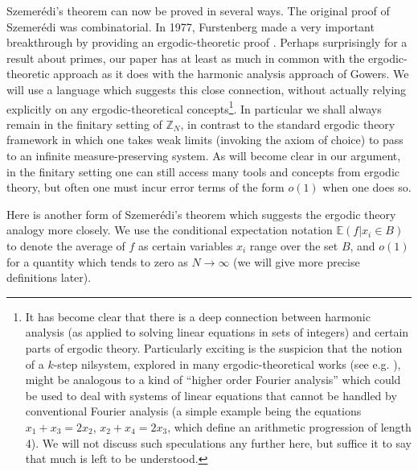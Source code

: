\documentclass[12pt,a4paper,reqno]{amsart}
\numberwithin{equation}{section}
\theoremstyle{plain}
\theoremstyle{definition}
\def\Z{{\mathbb Z}}
\def\vs{\vspace{11pt}}
\def\ni{\noindent}
\begin{document}
\ni Szemer\'edi's theorem can now be proved in several ways. The original proof of Szemer\'edi \cite{szemeredi-4,szemeredi} was combinatorial. In 1977, Furstenberg made a very important breakthrough by providing an ergodic-theoretic proof \cite{furst}. Perhaps surprisingly for a result about primes, our paper has at least as much in common with the ergodic-theoretic approach as it does with the harmonic analysis approach of Gowers. We will use a language which suggests this close connection, without actually relying explicitly on any ergodic-theoretical concepts\footnote{It has become clear that there is a deep connection between harmonic analysis (as applied to solving linear equations in sets of integers) and certain parts of ergodic theory. Particularly exciting is the suspicion that the notion of a $k$-step nilsystem, explored in many ergodic-theoretical works (see e.g. \cite{host-kra1,host-kra2,host-kra3,ziegler}), might be analogous to a kind of ``higher order Fourier analysis'' which could be used to deal with systems of linear equations that cannot be handled by conventional Fourier analysis (a simple example being the equations $x_1 + x_3 = 2x_2$, $x_2 + x_4 = 2x_3$, which define an arithmetic progression of length 4). We will not discuss such speculations any further here, but suffice it to say that much is left to be understood.}.
In particular we shall always remain in the finitary setting of $\Z_N$, in contrast to the standard ergodic theory framework in which one takes weak limits (invoking the axiom of choice) to pass to an infinite measure-preserving system.
As will become clear in our argument, 
in the finitary setting one can still access many
tools and concepts from ergodic theory, but often one must incur error terms of the form $o(1)$ when one does so.\vs

\ni Here is another form of Szemer\'edi's theorem which suggests the ergodic theory analogy more closely. We use the conditional expectation notation $\mathbb{E}(f | x_i \in B)$ to denote the average of $f$ as certain variables $x_i$ range over the set $B$,
and $o(1)$ for a quantity which tends to zero as $N \rightarrow \infty$ (we will give more precise definitions later).
\end{document}
